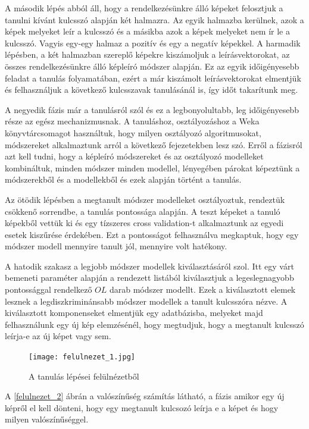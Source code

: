 \documentclass[12pt, a4paper, oneside]{book}
\theoremstyle{tetel}
\begin{document}
	A második lépés abból áll, hogy a rendelkezésünkre álló képeket felosztjuk a tanulni kívánt kulcsszó alapján két halmazra. Az egyik halmazba kerülnek, azok a képek melyeket leír a kulcsszó és a másikba azok a képek melyeket nem ír le a kulcsszó. Vagyis egy-egy halmaz a pozitív és egy a negatív képekkel. 
A harmadik lépésben, a két halmazban szereplő képekre kiszámoljuk a leírásvektorokat, az összes rendelkezésünkre álló képleíró módszer alapján. Ez az egyik időigényesebb feladat a tanulás folyamatában, ezért a már kiszámolt leírásvektorokat elmentjük és felhasználjuk a következő kulcsszavak tanulásánál is, így időt takarítunk meg.

	A negyedik fázis már a tanulásról szól és ez a legbonyolultabb, leg időigényesebb része az egész mechanizmusnak. A tanuláshoz, osztályozáshoz a Weka \cite{16} könyvtárcsomagot használtuk, hogy milyen osztályozó algoritmusokat, módszereket alkalmaztunk arról a következő fejezetekben lesz szó. Erről a fázisról azt kell tudni, hogy a képleíró módszereket és az osztályozó modelleket kombináltuk, minden módszer minden modellel, lényegében párokat képeztünk a módszerekből és a modellekből és ezek alapján történt a tanulás. 

	Az ötödik lépésben a megtanult módszer modelleket osztályoztuk, rendeztük csökkenő sorrendbe, a tanulás pontossága alapján. A teszt képeket a tanuló képekből vettük ki és egy tízszeres cross validation-t \cite{17} alkalmaztunk az egyedi esetek kiszűrése érdekében. Ezt a pontosságot felhasználva megkaptuk, hogy egy módszer modell mennyire tanult jól, mennyire volt hatékony. 

	A hatodik szakasz a legjobb módszer modellek kiválasztásáról szol. Itt egy várt bemeneti paraméter alapján a rendezett listából kiválasztjuk a legeslegnagyobb pontossággal rendelkező $OL$ darab módszer modellt. Ezek a kiválasztott elemek lesznek a legdiszkriminánsabb módszer modellek a tanult kulcsszóra nézve. A kiválasztott komponenseket elmentjük egy adatbázisba, melyeket majd felhasználunk egy új kép elemzésénél, hogy megtudjuk, hogy a megtanult kulcsszó leírja-e az új képet vagy sem. 

\begin{figure}[h]
\begin{center}
\texttt{[image: felulnezet\_1.jpg]}
\caption{{A tanulás lépései felülnézetből}}
\label{felulnezet_1}
\end{center}
\end{figure}

	A \ref{felulnezet_2} ábrán a valószínűség számítás látható, a fázis amikor egy új képről el kell dönteni, hogy egy megtanult kulcsozó leírja e a képet és hogy milyen valószínűséggel. 
\end{document}
